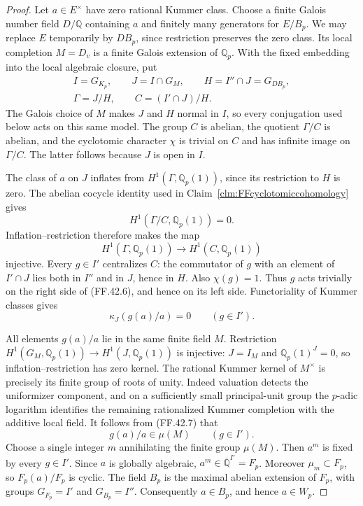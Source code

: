 \begin{proof}
Let \(a\in E^\times\) have zero
rational Kummer class. Choose a finite
Galois number field \(D/\mathbb Q\)
containing \(a\) and finitely many
generators for \(E/B_p\). We may
replace \(E\) temporarily by
\(DB_p\), since restriction preserves
the zero class. Its local completion
\(M=D_v\) is a finite Galois extension
of \(\mathbb Q_p\). With the fixed
embedding into the local algebraic
closure, put
\[
 \begin{gathered}
 I=G_{K_p},\qquad J=I\cap G_M,\qquad
 H=I''\cap J=G_{DB_p},\\
 \Gamma=J/H,\qquad C=(I'\cap J)/H.
 \end{gathered}
                                                        \tag{FF.42.5}
\]
The Galois choice of \(M\) makes
\(J\) and \(H\) normal in \(I\),
so every conjugation used below acts
on this same model. The group \(C\)
is abelian, the quotient \(\Gamma/C\)
is abelian, and the cyclotomic
character \(\chi\) is trivial on
\(C\) and has infinite image on
\(\Gamma/C\). The latter follows
because \(J\) is open in \(I\).

The class of \(a\) on \(J\)
inflates from \(H^1(\Gamma,\mathbb Q_p(1))\),
since its restriction to \(H\) is
zero. The abelian cocycle identity
used in Claim~\ref{clm:FFcyclotomiccohomology}
gives
\[
                 H^1(\Gamma/C,\mathbb Q_p(1))=0.
\]
Inflation--restriction therefore makes
the map
\[
 H^1(\Gamma,\mathbb Q_p(1))
       \longrightarrow H^1(C,\mathbb Q_p(1))
                                                        \tag{FF.42.6}
\]
injective. Every \(g\in I'\)
centralizes \(C\): the commutator
of \(g\) with an element of
\(I'\cap J\) lies both in
\(I''\) and in \(J\), hence
in \(H\). Also \(\chi(g)=1\).
Thus \(g\) acts trivially on the
right side of (FF.42.6), and hence
on its left side. Functoriality of
Kummer classes gives
\[
                         \kappa_J(g(a)/a)=0
                         \qquad(g\in I').
                                                        \tag{FF.42.7}
\]

All elements \(g(a)/a\) lie in
the same finite field \(M\).
Restriction
\(H^1(G_M,\mathbb Q_p(1))
\longrightarrow H^1(J,\mathbb Q_p(1))\)
is injective: \(J=I_M\) and
\(\mathbb Q_p(1)^J=0\), so
inflation--restriction has zero
kernel. The rational Kummer kernel
of \(M^\times\) is precisely its
finite group of roots of unity.
Indeed valuation detects the
uniformizer component, and on a
sufficiently small principal-unit
group the \(p\)-adic logarithm
identifies the remaining rationalized
Kummer completion with the additive
local field. It follows from
(FF.42.7) that
\[
                            g(a)/a\in\mu(M)
                            \qquad(g\in I').
                                                        \tag{FF.42.8}
\]
Choose a single integer \(m\)
annihilating the finite group
\(\mu(M)\). Then \(a^m\) is
fixed by every \(g\in I'\).
Since \(a\) is globally algebraic,
\(a^m\in\overline{\mathbb Q}^{I'}=F_p\).
Moreover \(\mu_m\subset F_p\),
so \(F_p(a)/F_p\) is cyclic.
The field \(B_p\) is the maximal
abelian extension of \(F_p\), with
groups \(G_{F_p}=I'\) and
\(G_{B_p}=I''\). Consequently
\(a\in B_p\), and hence
\(a\in W_p\).


\end{proof}
